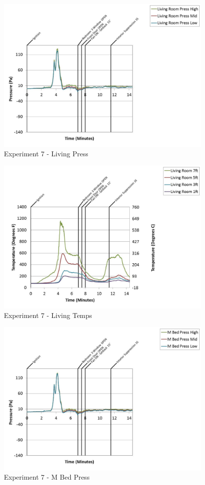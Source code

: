 \documentclass{article}
\begin{document}
\begin{appendices}
	\begin{figure}[h!]
		\centering
		\includegraphics[height=3.05in]{0_Images/Results_Charts/Exp_7_Charts/LivingPress.pdf}
		\caption{Experiment 7 - Living Press}
	\end{figure}
 
	\clearpage

	\begin{figure}[h!]
		\centering
		\includegraphics[height=3.05in]{0_Images/Results_Charts/Exp_7_Charts/LivingTemps.pdf}
		\caption{Experiment 7 - Living Temps}
	\end{figure}
 

	\begin{figure}[h!]
		\centering
		\includegraphics[height=3.05in]{0_Images/Results_Charts/Exp_7_Charts/MBedPress.pdf}
		\caption{Experiment 7 - M Bed Press}
	\end{figure}
 

\end{appendices}
\end{document}
